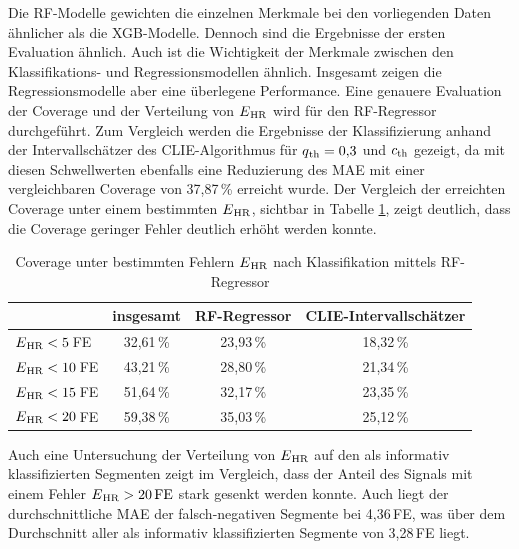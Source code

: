  Die \ac{RF}-Modelle gewichten die einzelnen Merkmale bei den vorliegenden Daten ähnlicher als die \ac{XGB}-Modelle. Dennoch sind die Ergebnisse der ersten Evaluation ähnlich. Auch ist die Wichtigkeit der Merkmale zwischen den Klassifikations- und Regressionsmodellen ähnlich. Insgesamt zeigen die Regressionsmodelle aber eine überlegene Performance. Eine genauere Evaluation der Coverage und der Verteilung von $E\textsubscript{HR}$ wird für den \ac{RF}-Regressor durchgeführt. Zum Vergleich werden die Ergebnisse der Klassifizierung anhand der Intervallschätzer des \ac{CLIE}-Algorithmus für $q\textsubscript{th}=0{,}3$ und $c\textsubscript{th}$ gezeigt, da mit diesen Schwellwerten ebenfalls eine Reduzierung des \ac{MAE} mit einer vergleichbaren Coverage von 37,87\,\% erreicht wurde. Der Vergleich der erreichten Coverage unter einem bestimmten $E\textsubscript{HR}$, sichtbar in Tabelle \ref{fig:own-coverage-default}, zeigt deutlich, dass die Coverage geringer Fehler deutlich erhöht werden konnte. 
 
  \begin{table}[h]
 	\centering
  	\begin{tabular}{l || c | c | c}
 											& insgesamt 		& \ac{RF}-Regressor & \ac{CLIE}-Intervallschätzer\\\hline
 		$E\textsubscript{HR} < 5$\,\si{FE} 	&  32{,}61\,\% 	& 23,93\,\% 			& 18,32\,\%\\
 		$E\textsubscript{HR} < 10$\,\si{FE} 	&  43{,}21\,\% 	& 28,80\,\% 			& 21,34\,\%\\
 		$E\textsubscript{HR} < 15$\,\si{FE} 	&  51{,}64\,\% 	& 32,17\,\% 			& 23,35\,\%\\
 		$E\textsubscript{HR} < 20$\,\si{FE} 	&  59{,}38\,\% 	& 35,03\,\% 			& 25,12\,\%\\
 	\end{tabular}
 	\caption[Coverage unter bestimmten Fehlern $E\textsubscript{HR}$ nach Klassifikation mittels \ac{RF}-Regressor]{Coverage unter bestimmten Fehlern $E\textsubscript{HR}$ nach Klassifikation mittels \ac{RF}-Regressor}
 	\label{fig:own-coverage-default}
 \end{table}
 
 Auch eine Untersuchung der Verteilung von $E\textsubscript{HR}$ auf den als informativ klassifizierten Segmenten zeigt im Vergleich, dass der Anteil des Signals mit einem Fehler $E\textsubscript{HR} > 20\,\si{FE}$ stark gesenkt werden konnte. Auch liegt der durchschnittliche \ac{MAE} der falsch-negativen Segmente bei 4,36\,\si{FE}, was über dem Durchschnitt aller als informativ klassifizierten Segmente von 3,28\,\si{FE} liegt.
 
